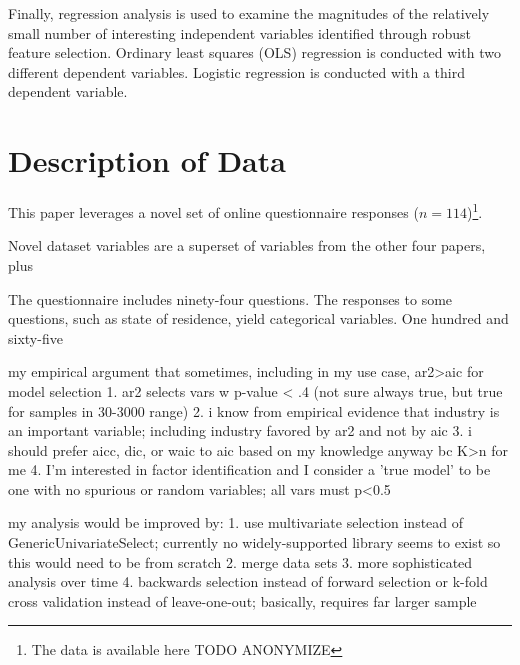 \documentclass[review]{elsarticle}
\begin{document}
Finally, regression analysis is used to examine the magnitudes of the relatively small
number of interesting independent variables identified through robust feature selection.
Ordinary least squares (OLS) regression is conducted with two different dependent variables.
Logistic regression is conducted with a third dependent variable.


\section{Description of Data}


This paper leverages a novel set of online questionnaire responses ($n = 114$)\footnote{
    The data is available here TODO ANONYMIZE
}.

Novel dataset variables are a superset of variables from the other four papers, plus

The questionnaire includes ninety-four questions.
The responses to some questions, such as state of residence, yield categorical variables.
One hundred and sixty-five


my empirical argument that sometimes, including in my use case, ar2>aic for model selection
1. ar2 selects vars w p-value < .4 (not sure always true, but true for samples in 30-3000 range)
2. i know from empirical evidence that industry is an important variable; including industry favored by ar2 and not by aic
3. i should prefer aicc, dic, or waic to aic based on my knowledge anyway bc K>n for me
4. I'm interested in factor identification and I consider a 'true model' to be one with no spurious or random variables; all vars must p<0.5

my analysis would be improved by:
  1. use multivariate selection instead of GenericUnivariateSelect; currently no widely-supported library seems to exist so this would need to be from scratch
  2. merge data sets
  3. more sophisticated analysis over time
  4. backwards selection instead of forward selection or k-fold cross validation instead of leave-one-out; basically, requires far larger sample

\end{document}
